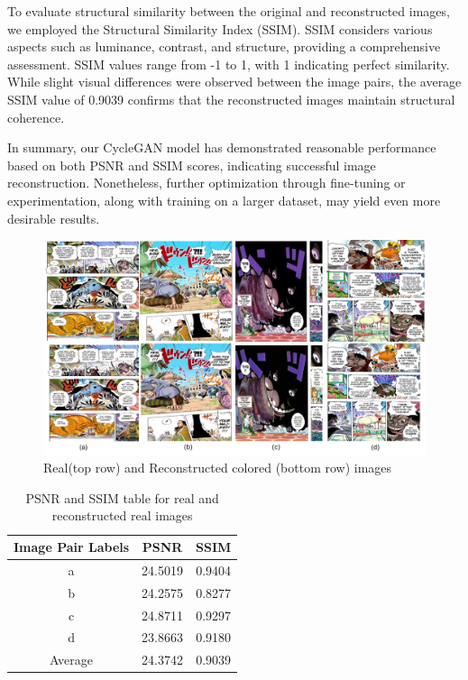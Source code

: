 To evaluate structural similarity between the original and reconstructed images, we employed the Structural Similarity Index (SSIM). SSIM considers various aspects such as luminance, contrast, and structure, providing a comprehensive assessment. SSIM values range from -1 to 1, with 1 indicating perfect similarity. While slight visual differences were observed between the image pairs, the average SSIM value of 0.9039 confirms that the reconstructed images maintain structural coherence.

In summary, our CycleGAN model has demonstrated reasonable performance based on both PSNR and SSIM scores, indicating successful image reconstruction. Nonetheless, further optimization through fine-tuning or experimentation, along with training on a larger dataset, may yield even more desirable results.


\begin{figure} [htbp]
    \centering
        \includegraphics[height=0.4\textwidth]{img_psnr/perf_metrics.jpg}
    \caption{Real(top row) and Reconstructed colored (bottom row) images}
    \label{fig:comparision real and reconstructed}
\end{figure}


\begin{table} [htbp]
    \centering
    \begin{tabular}{|c|c|c|} \hline
         Image Pair Labels&  PSNR&  SSIM\\ \hline 
            a&  24.5019&  0.9404\\ \hline 
            b&  24.2575&  0.8277\\ \hline
            c& 24.8711& 0.9297\\\hline
            d& 23.8663& 0.9180\\\hline
            Average& 24.3742& 0.9039\\\hline
    \end{tabular}
    \label{tab:PSNR and SSIM table for real and reconstructed real images }
    \caption{PSNR and SSIM table for real and reconstructed real images }
\end{table}
